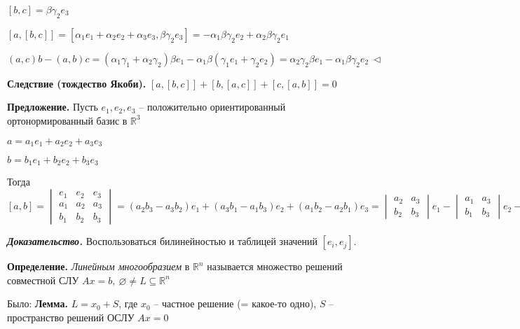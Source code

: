$[b, c] = \beta \gamma_2 e_3$

$[a, [b, c]] = [\alpha_1 e_1 + \alpha_2 e_2 + \alpha_3 e_3, \beta \gamma_2 e_3] = -\alpha_1 \beta \gamma_2 e_2 + \alpha_2 \beta \gamma_2 e_1$

$(a, c) b - (a, b) c = (\alpha_1 \gamma_1 + \alpha_2 \gamma_2) \beta e_1 - \alpha_1 \beta (\gamma_1 e_1 + \gamma_2 e_2) = \alpha_2 \gamma_2 \beta e_1 - \alpha_1 \beta \gamma_2 e_2 \ \lhd$

\vspace{\baselineskip}
\textbf{Следствие (тождество Якоби).} $[a, [b, c]] + [b, [a, c]] + [c, [a, b]] = 0$

\vspace{\baselineskip}
\textbf{Предложение.} Пусть $e_1, e_2, e_3$ -- положительно ориентированный ортонормированный базис в $\mathbb{R}^3$

$a = a_1 e_1 + a_2 e_2 + a_3 e_3$

$b = b_1 e_1 + b_2 e_2 + b_3 e_3$

Тогда $[a, b] = \begin{vmatrix} e_1 & e_2 & e_3 \\ a_1 & a_2 & a_3 \\ b_1 & b_2 & b_3 \end{vmatrix} = (a_2 b_3 - a_3 b_2) e_1 + (a_3 b_1 - a_1 b_3) e_2 + (a_1 b_2 - a_2 b_1) e_3 = \begin{vmatrix} a_2 & a_3 \\ b_2 & b_3 \end{vmatrix} e_1 - \begin{vmatrix} a_1 & a_3 \\ b_1 & b_3 \end{vmatrix} e_2 - \begin{vmatrix} a_1 & a_2 \\ b_1 & b_2 \end{vmatrix} e_3 $

\vspace{\baselineskip}
\textbf{\textit{Доказательство.}} Воспользоваться билинейностью и таблицей значений $[e_i, e_j]$.

\vspace{\baselineskip}
\textbf{Определение.} \textit{Линейным многообразием} в $\mathbb{R}^n$ называется множество решений совместной СЛУ $Ax = b, \ \varnothing \neq L \subseteq \mathbb{R}^n$

\vspace{\baselineskip}
Было:
\textbf{Лемма.} $L = x_0 + S$, где $x_0$ -- частное решение (= какое-то одно), $S$ -- пространство решений ОСЛУ $Ax = 0$

